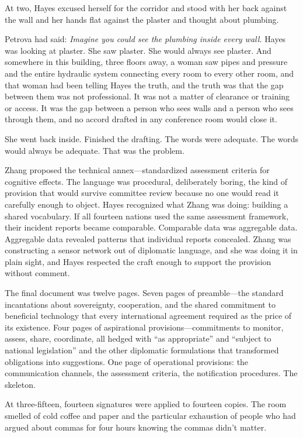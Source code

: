 At two, Hayes excused herself for the corridor and stood with her back against the wall and her hands flat against the plaster and thought about plumbing.

Petrova had said: \textit{Imagine you could see the plumbing inside every wall.} Hayes was looking at plaster. She saw plaster. She would always see plaster. And somewhere in this building, three floors away, a woman saw pipes and pressure and the entire hydraulic system connecting every room to every other room, and that woman had been telling Hayes the truth, and the truth was that the gap between them was not professional. It was not a matter of clearance or training or access. It was the gap between a person who sees walls and a person who sees through them, and no accord drafted in any conference room would close it.

She went back inside. Finished the drafting. The words were adequate. The words would always be adequate. That was the problem.

Zhang proposed the technical annex---standardized assessment criteria for cognitive effects. The language was procedural, deliberately boring, the kind of provision that would survive committee review because no one would read it carefully enough to object. Hayes recognized what Zhang was doing: building a shared vocabulary. If all fourteen nations used the same assessment framework, their incident reports became comparable. Comparable data was aggregable data. Aggregable data revealed patterns that individual reports concealed. Zhang was constructing a sensor network out of diplomatic language, and she was doing it in plain sight, and Hayes respected the craft enough to support the provision without comment.

The final document was twelve pages. Seven pages of preamble---the standard incantations about sovereignty, cooperation, and the shared commitment to beneficial technology that every international agreement required as the price of its existence. Four pages of aspirational provisions---commitments to monitor, assess, share, coordinate, all hedged with ``as appropriate'' and ``subject to national legislation'' and the other diplomatic formulations that transformed obligations into suggestions. One page of operational provisions: the communication channels, the assessment criteria, the notification procedures. The skeleton.

At three-fifteen, fourteen signatures were applied to fourteen copies. The room smelled of cold coffee and paper and the particular exhaustion of people who had argued about commas for four hours knowing the commas didn't matter.

